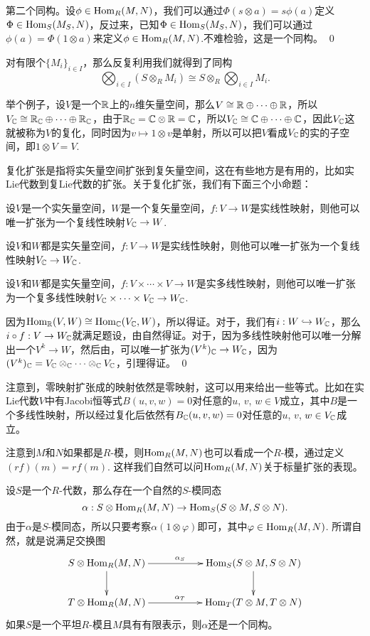 第二个同构。设$\phi\in \operatorname{Hom}_R(M,N)$，我们可以通过$\Phi(s\otimes a)=s\phi(a)$定义$\Phi\in \operatorname{Hom}_S(M_S,N)$，反过来，已知$\Phi\in \operatorname{Hom}_S(M_S,N)$，我们可以通过$\phi(a)=\Phi(1\otimes a)$来定义$\phi\in \operatorname{Hom}_R(M,N)$.不难检验，这是一个同构。 \qed

对有限个$\{M_i\}_{i\in I}$，那么反复利用我们就得到了同构
\[
\bigotimes_{i\in I} \left(S\otimes_RM_i\right)\cong S\otimes_R\bigotimes_{i\in I} M_i.
\]

\para 举个例子，设$V$是一个$\mathbb{R}$上的$n$维矢量空间，那么$V\cong \mathbb{R}\oplus \cdots \oplus \mathbb{R}$，所以$V_{\mathbb{C}}\cong \mathbb{R}_{\mathbb{C}}\oplus \cdots \oplus \mathbb{R}_{\mathbb{C}}$，由于$\mathbb{R}_{\mathbb{C}}=\mathbb{C}\otimes \mathbb{R}=\mathbb{C}$，所以$V_{\mathbb{C}}\cong \mathbb{C}\oplus \cdots \oplus \mathbb{C}$，因此$V_{\mathbb{C}}$这就被称为$V$的复化，同时因为$v\mapsto 1\otimes v$是单射，所以可以把$V$看成$V_{\mathbb{C}}$的实的子空间，即$1\otimes V=V$.

\para 复化扩张是指将实矢量空间扩张到复矢量空间，这在有些地方是有用的，比如实Lie代数到复Lie代数的扩张。关于复化扩张，我们有下面三个小命题：

设$V$是一个实矢量空间，$W$是一个复矢量空间，$f:V\to W$是实线性映射，则他可以唯一扩张为一个复线性映射$V_{\mathbb{C}}\to W$.

设$V$和$W$都是实矢量空间，$f:V\to W$是实线性映射，则他可以唯一扩张为一个复线性映射$V_{\mathbb{C}}\to W_{\mathbb{C}}$.

设$V$和$W$都是实矢量空间，$f:V\times\cdots\times V\to W$是实多线性映射，则他可以唯一扩张为一个复多线性映射$V_{\mathbb{C}}\times\cdots\times V_{\mathbb{C}}\to W_{\mathbb{C}}$.

\proof 
	因为$\operatorname{Hom}_{\mathbb{R}}(V,W)\cong \operatorname{Hom}_{\mathbb{C}}(V_{\mathbb{C}},W)$，所以得证。对于，我们有$i:W\hookrightarrow W_{\mathbb{C}}$，那么$i\circ f:V\to W_{\mathbb{C}}$就满足题设，由自然得证。对于，因为多线性映射他可以唯一分解出一个$V^k\to W$，然后由，可以唯一扩张为$(V^k)_{\mathbb{C}}\to W_{\mathbb{C}}$，因为$(V^k)_{\mathbb{C}}=V_{\mathbb{C}}\otimes_{\mathbb{C}} \cdots\otimes_{\mathbb{C}} V_{\mathbb{C}}$，引理得证。
\qed

注意到，零映射扩张成的映射依然是零映射，这可以用来给出一些等式。比如在实Lie代数$V$中有Jacobi恒等式$B(u,v,w)=0$对任意的$u$, $v$, $w\in V$成立，其中$B$是一个多线性映射，所以经过复化后依然有$B_{\mathbb{C}} (u,v,w)=0$对任意的$u$, $v$, $w\in V_{\mathbb{C}}$成立。

\para 注意到$M$和$N$如果都是$R$-模，则$\operatorname{Hom}_R(M,N)$也可以看成一个$R$-模，通过定义$(rf)(m)=rf(m)$. 这样我们自然可以问$\operatorname{Hom}_R(M,N)$关于标量扩张的表现。

设$S$是一个$R$-代数，那么存在一个自然的$S$-模同态
\[
	\alpha:S\otimes\operatorname{Hom}_R(M,N)\to \operatorname{Hom}_S(S\otimes M,S\otimes N).
\]
由于$\alpha$是$S$-模同态，所以只要考察$\alpha(1\otimes \varphi)$即可，其中$\varphi\in \operatorname{Hom}_R(M,N)$. 所谓自然，就是说满足交换图
\[
\begin{xy}
	\xymatrix
	{
		S\otimes\Hom_R(M,N)\ar[rr]^{\alpha_S}\ar[d]&&\Hom_S(S\otimes M,S\otimes N)\ar[d]\\
		T\otimes\Hom_R(M,N)\ar[rr]^{\alpha_T}&&\Hom_T(T\otimes M,T\otimes N)
	}
\end{xy}
\]
如果$S$是一个平坦$R$-模且$M$具有有限表示，则$\alpha$还是一个同构。

